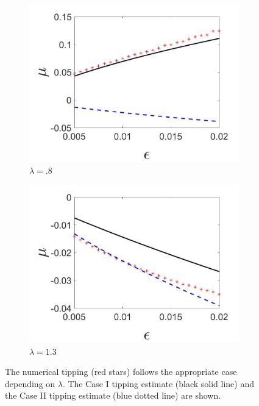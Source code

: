 \begin{figure}[H]
\centering
\begin{subfigure}{.5\textwidth}
 \centering
 \includegraphics[width=\linewidth]{oneD/slowosc_epscomp_case2.jpg}
 \caption{$\lambda=.8$}
\end{subfigure}%
\begin{subfigure}{.5\textwidth}
 \centering
 \includegraphics[width=\linewidth]{oneD/slowosc_epscomp_case3.jpg}
 \caption{$\lambda=1.3$}
\end{subfigure}
\caption{The numerical tipping (red stars) follows the appropriate case depending on $\lambda$. The Case I tipping estimate (black solid line) and the Case II tipping estimate (blue dotted line) are shown.}
\label{fig:oneD_slowosc_epscomp}
\end{figure}

